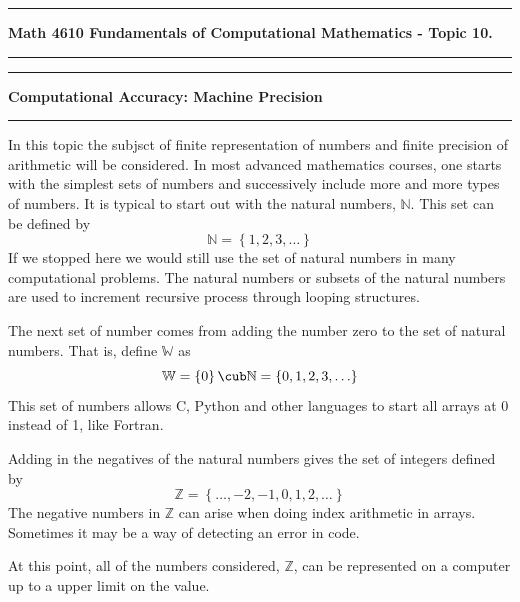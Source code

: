 \documentclass[10pt,fleqn]{article}
\begin{document}
\vskip0.1in\hrule\vskip0.1in \noindent
{\bf Math 4610 Fundamentals of Computational Mathematics  - Topic 10.}
\vskip0.1in\hrule\vskip0.1in \noindent
\vskip0.1in\hrule\vskip0.1in\noindent
{\bf Computational Accuracy: Machine Precision} 
\vskip0.1in\hrule\vskip0.1in\noindent
In this topic the subjsct of finite representation of numbers and finite
precision of arithmetic will be considered. In most advanced mathematics
courses, one starts with the simplest sets of numbers and successively include
more and more types of numbers. It is typical to start out with the natural
numbers, \(\mathbb{N}\). This set can be defined by
\[
  \mathbb{N} = \left\lbrace 1, 2, 3, \ldots \right\rbrace
\]
If we stopped here we would still use the set of natural numbers in many
computational problems. The natural numbers or subsets of the natural numbers
are used to increment recursive process through looping structures.

The next set of number comes from adding the number zero to the set of natural
numbers. That is, define \(\mathbb{W}\) as
\[
  \mathbb{W} = \left\lbrace 0\right\rbrace \cub\mathbb{N}
             = \left\lbrace 0, 1, 2, 3, \ldots \right\rbrace 
\]
This set of numbers allows C, Python and other languages to start all arrays at
0 instead of 1, like Fortran.

Adding in the negatives of the natural numbers gives the set of integers defined
by
\[
  \mathbb{Z} = \left\lbrace \ldots, -2, -1, 0, 1, 2, \ldots \right\rbrace 
\]
The negative numbers in \(\mathbb{Z}\) can arise when doing index arithmetic in
arrays. Sometimes it may be a way of detecting an error in code.

At this point, all of the numbers considered, \(\mathbb{Z}\), can be represented
on a computer up to a upper limit on the value. 
\end{document}
